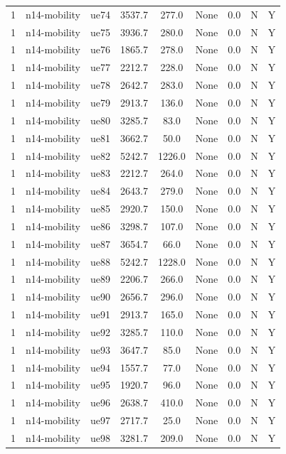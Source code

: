 \begin{table}[ht]
\begin{tabular}{|c|c|c|c|c|c|c|c|c|}
1 & n14-mobility & ue74 & 3537.7 & 277.0 & None & 0.0 & N & Y \\
1 & n14-mobility & ue75 & 3936.7 & 280.0 & None & 0.0 & N & Y \\
1 & n14-mobility & ue76 & 1865.7 & 278.0 & None & 0.0 & N & Y \\
1 & n14-mobility & ue77 & 2212.7 & 228.0 & None & 0.0 & N & Y \\
1 & n14-mobility & ue78 & 2642.7 & 283.0 & None & 0.0 & N & Y \\
1 & n14-mobility & ue79 & 2913.7 & 136.0 & None & 0.0 & N & Y \\
1 & n14-mobility & ue80 & 3285.7 & 83.0 & None & 0.0 & N & Y \\
1 & n14-mobility & ue81 & 3662.7 & 50.0 & None & 0.0 & N & Y \\
1 & n14-mobility & ue82 & 5242.7 & 1226.0 & None & 0.0 & N & Y \\
1 & n14-mobility & ue83 & 2212.7 & 264.0 & None & 0.0 & N & Y \\
1 & n14-mobility & ue84 & 2643.7 & 279.0 & None & 0.0 & N & Y \\
1 & n14-mobility & ue85 & 2920.7 & 150.0 & None & 0.0 & N & Y \\
1 & n14-mobility & ue86 & 3298.7 & 107.0 & None & 0.0 & N & Y \\
1 & n14-mobility & ue87 & 3654.7 & 66.0 & None & 0.0 & N & Y \\
1 & n14-mobility & ue88 & 5242.7 & 1228.0 & None & 0.0 & N & Y \\
1 & n14-mobility & ue89 & 2206.7 & 266.0 & None & 0.0 & N & Y \\
1 & n14-mobility & ue90 & 2656.7 & 296.0 & None & 0.0 & N & Y \\
1 & n14-mobility & ue91 & 2913.7 & 165.0 & None & 0.0 & N & Y \\
1 & n14-mobility & ue92 & 3285.7 & 110.0 & None & 0.0 & N & Y \\
1 & n14-mobility & ue93 & 3647.7 & 85.0 & None & 0.0 & N & Y \\
1 & n14-mobility & ue94 & 1557.7 & 77.0 & None & 0.0 & N & Y \\
1 & n14-mobility & ue95 & 1920.7 & 96.0 & None & 0.0 & N & Y \\
1 & n14-mobility & ue96 & 2638.7 & 410.0 & None & 0.0 & N & Y \\
1 & n14-mobility & ue97 & 2717.7 & 25.0 & None & 0.0 & N & Y \\
1 & n14-mobility & ue98 & 3281.7 & 209.0 & None & 0.0 & N & Y \\

\end{tabular}
\end{table}
